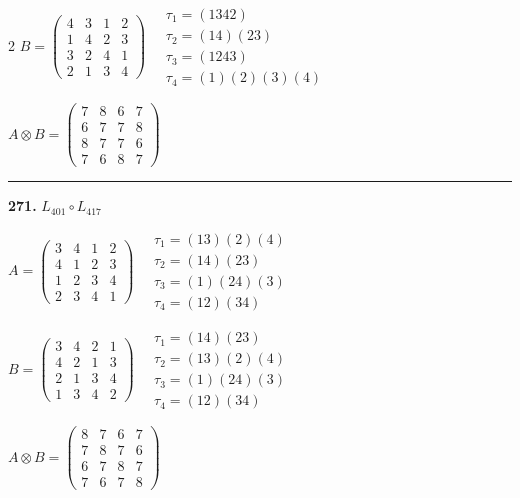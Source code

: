 \begin{multicols}{2}
$B = \begin{pmatrix} 4 & 3 & 1 & 2 \\ 1 & 4 & 2 & 3 \\ 3 & 2 & 4 & 1 \\ 2 & 1 & 3 & 4 \end{pmatrix} \quad \begin{matrix} \tau_{1}=(1 3 4 2) \\ \tau_{2}=(1 4)(2 3) \\ \tau_{3}=(1 2 4 3) \\ \tau_{4}=(1)(2)(3)(4) \end{matrix}$

$A \otimes B = \begin{pmatrix} 7 & 8 & 6 & 7 \\ 6 & 7 & 7 & 8 \\ 8 & 7 & 7 & 6 \\ 7 & 6 & 8 & 7 \end{pmatrix}$

\vspace{0.3em}
\hrule
\vspace{0.3em}

\noindent\textbf{271.} $L_{401} \circ L_{417}$

$A = \begin{pmatrix} 3 & 4 & 1 & 2 \\ 4 & 1 & 2 & 3 \\ 1 & 2 & 3 & 4 \\ 2 & 3 & 4 & 1 \end{pmatrix} \quad \begin{matrix} \tau_{1}=(1 3)(2)(4) \\ \tau_{2}=(1 4)(2 3) \\ \tau_{3}=(1)(2 4)(3) \\ \tau_{4}=(1 2)(3 4) \end{matrix}$

$B = \begin{pmatrix} 3 & 4 & 2 & 1 \\ 4 & 2 & 1 & 3 \\ 2 & 1 & 3 & 4 \\ 1 & 3 & 4 & 2 \end{pmatrix} \quad \begin{matrix} \tau_{1}=(1 4)(2 3) \\ \tau_{2}=(1 3)(2)(4) \\ \tau_{3}=(1)(2 4)(3) \\ \tau_{4}=(1 2)(3 4) \end{matrix}$

$A \otimes B = \begin{pmatrix} 8 & 7 & 6 & 7 \\ 7 & 8 & 7 & 6 \\ 6 & 7 & 8 & 7 \\ 7 & 6 & 7 & 8 \end{pmatrix}$


\end{multicols}
